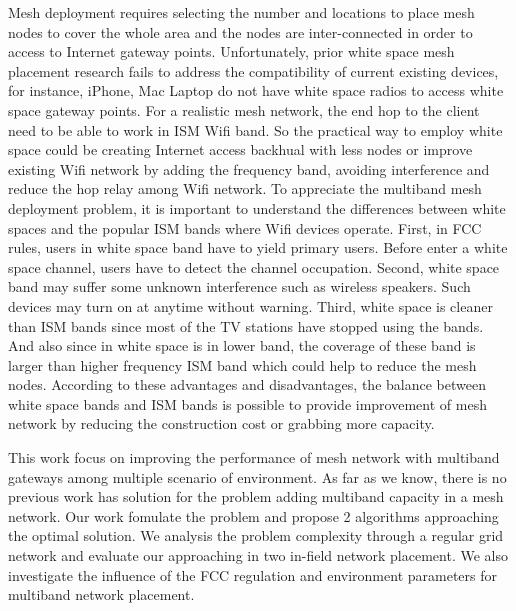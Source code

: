 Mesh deployment requires selecting the number and locations to place mesh nodes to cover the whole area and the nodes are inter-connected in order to access to Internet gateway points.
Unfortunately, prior white space mesh placement research fails to address the compatibility of current existing devices, for instance, iPhone, Mac Laptop do not have white space radios to access white space gateway points. For a realistic mesh network, the end hop to the client need to be able to work in ISM Wifi band. 
So the practical way to employ white space could be creating Internet access backhual with less nodes or improve existing Wifi network by adding the frequency band, avoiding interference and reduce the hop relay among Wifi network.
To appreciate the multiband mesh deployment problem, it is important to understand the differences between white spaces and the popular ISM bands where Wifi devices operate. First, in FCC rules, users in white space band have to yield primary users.
Before enter a white space channel, users have to detect the channel occupation. 
Second, white space band may suffer some unknown interference such as wireless speakers. Such devices may turn on at anytime without warning. 
Third, white space is cleaner than ISM bands since most of the TV stations have stopped using the bands. 
And also since in white space is in lower band, the coverage of these band is larger than higher frequency ISM band which could help to reduce the mesh nodes. 
According to these advantages and disadvantages, the balance between white space bands and ISM bands is possible to provide improvement of mesh network by reducing the construction cost or grabbing more capacity. 



This work focus on improving the performance of mesh network with multiband gateways among multiple scenario of environment. As far as we know, there is no previous work has solution for the problem adding multiband capacity in a mesh network. Our work fomulate the problem and propose 2 algorithms approaching the optimal solution.
We analysis the problem complexity through a regular grid network and evaluate our approaching in two in-field network placement. We also investigate the influence of the FCC regulation and environment parameters for multiband network placement.

% 

